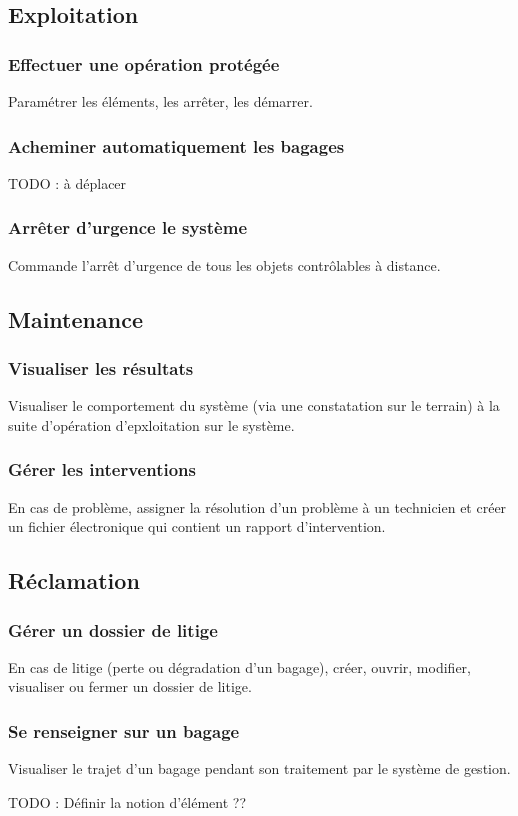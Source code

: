 \subsection{Exploitation}
\subsubsection{Effectuer une opération protégée}
Paramétrer les éléments, les arrêter, les démarrer.
\subsubsection{Acheminer automatiquement les bagages}
{\huge TODO : à déplacer}
\subsubsection{Arrêter d'urgence le système}
Commande l'arrêt d'urgence de tous les objets contrôlables à distance.
\subsection{Maintenance}
\subsubsection{Visualiser les résultats}
Visualiser le comportement du système (via une constatation sur le terrain) à la suite d'opération d'epxloitation sur le système.

\subsubsection{Gérer les interventions}
En cas de problème, assigner la résolution d'un problème à un technicien et créer un fichier électronique qui contient un rapport d'intervention.

\subsection{Réclamation}
\subsubsection{Gérer un dossier de litige}
En cas de litige (perte ou dégradation d'un bagage), créer, ouvrir, modifier, visualiser ou fermer un dossier de litige.

\subsubsection{Se renseigner sur un bagage}
Visualiser le trajet d'un bagage pendant son traitement par le système de gestion.

{\huge TODO : Définir la notion d'élément ??}


